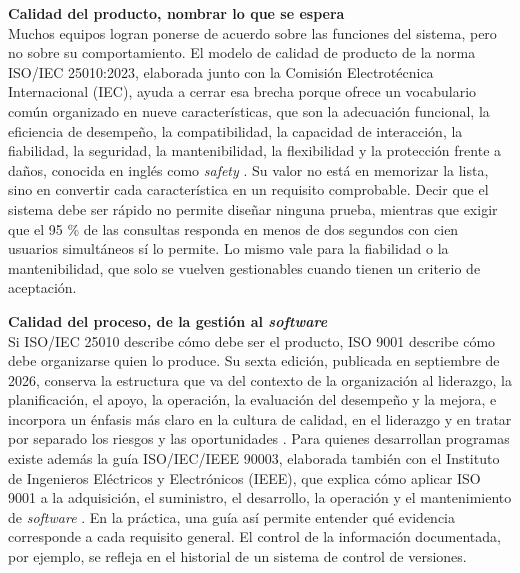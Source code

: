 \documentclass[12pt,letterpaper]{article}
\begin{document}
\textbf{Calidad del producto, nombrar lo que se espera}\\
Muchos equipos logran ponerse de acuerdo sobre las funciones del sistema, pero no sobre su comportamiento. El modelo de calidad de producto de la norma ISO/IEC 25010:2023, elaborada junto con la Comisión Electrotécnica Internacional (IEC), ayuda a cerrar esa brecha porque ofrece un vocabulario común organizado en nueve características, que son la adecuación funcional, la eficiencia de desempeño, la compatibilidad, la capacidad de interacción, la fiabilidad, la seguridad, la mantenibilidad, la flexibilidad y la protección frente a daños, conocida en inglés como \textit{safety} \parencite{iso_25010_2023}. Su valor no está en memorizar la lista, sino en convertir cada característica en un requisito comprobable. Decir que el sistema debe ser rápido no permite diseñar ninguna prueba, mientras que exigir que el 95 \% de las consultas responda en menos de dos segundos con cien usuarios simultáneos sí lo permite. Lo mismo vale para la fiabilidad o la mantenibilidad, que solo se vuelven gestionables cuando tienen un criterio de aceptación.

\textbf{Calidad del proceso, de la gestión al \textit{software}}\\
Si ISO/IEC 25010 describe cómo debe ser el producto, ISO 9001 describe cómo debe organizarse quien lo produce. Su sexta edición, publicada en septiembre de 2026, conserva la estructura que va del contexto de la organización al liderazgo, la planificación, el apoyo, la operación, la evaluación del desempeño y la mejora, e incorpora un énfasis más claro en la cultura de calidad, en el liderazgo y en tratar por separado los riesgos y las oportunidades \parencite{iso_9001_2026}. Para quienes desarrollan programas existe además la guía ISO/IEC/IEEE 90003, elaborada también con el Instituto de Ingenieros Eléctricos y Electrónicos (IEEE), que explica cómo aplicar ISO 9001 a la adquisición, el suministro, el desarrollo, la operación y el mantenimiento de \textit{software} \parencite{iso_90003_2018}. En la práctica, una guía así permite entender qué evidencia corresponde a cada requisito general. El control de la información documentada, por ejemplo, se refleja en el historial de un sistema de control de versiones.
\end{document}
